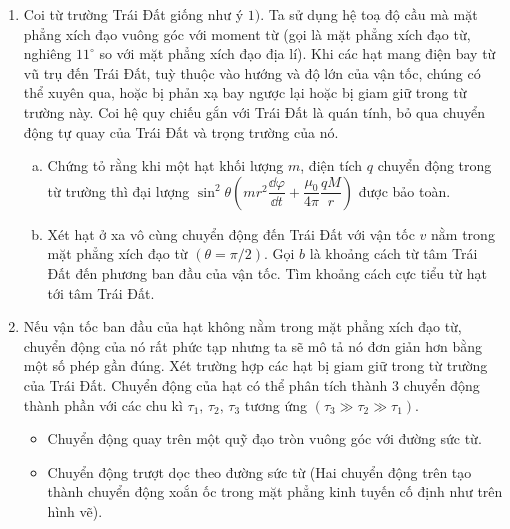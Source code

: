 \begin{vd}
\begin{enumerate}[1)]
\begin{enumerate}[a)]
\begin{center}
            \end{center}
        \end{enumerate}
        \item Coi từ trường Trái Đất giống như ý $1)$. Ta sử dụng hệ toạ độ cầu mà mặt phẳng xích đạo vuông góc với moment từ (gọi là mặt phẳng xích đạo từ, nghiêng $11^{\circ}$ so với mặt phẳng xích đạo địa lí).
        Khi các hạt mang điện bay từ vũ trụ đến Trái Đất, tuỳ thuộc vào hướng và độ lớn của vận tốc, chúng có thể xuyên qua, hoặc bị phản xạ bay ngược lại hoặc bị giam giữ trong từ trường này. Coi hệ quy chiếu gắn với Trái Đất là quán tính, bỏ qua chuyển động tự quay của Trái Đất và trọng trường của nó.
    \begin{enumerate}[a)]
        \item Chứng tỏ rằng khi một hạt khối lượng $m$, điện tích $q$ chuyển động trong từ trường thì đại lượng ${{\sin }^{2}}\theta \left( m{{r}^{2}}\dfrac{\dd \varphi }{\dd t}+\dfrac{{{\mu }_{0}}}{4\pi }\dfrac{qM}{r} \right)$ được bảo toàn.
        \item Xét hạt ở xa vô cùng chuyển động đến Trái Đất với vận tốc $v$ nằm trong mặt phẳng xích đạo từ $\left( \theta =\pi /2 \right)$. Gọi $b$ là khoảng cách từ tâm Trái Đất đến phương ban đầu của vận tốc. Tìm khoảng cách cực tiểu từ hạt tới tâm Trái Đất.
    \end{enumerate}
    \item Nếu vận tốc ban đầu của hạt không nằm trong mặt phẳng xích đạo từ, chuyển động của nó rất phức tạp nhưng ta sẽ mô tả nó đơn giản hơn bằng một số phép gần đúng. Xét trường hợp các hạt bị giam giữ trong từ trường của Trái Đất. Chuyển động của hạt có thể phân tích thành $3$ chuyển động thành phần với các chu kì ${{\tau }_{1}},\,{{\tau }_{2}},\,{{\tau }_{3}}$ tương ứng $({{\tau }_{3}}\gg{{\tau }_{2}}\gg{{\tau }_{1}})$.
    \begin{itemize}
        \item Chuyển động quay trên một quỹ đạo tròn vuông góc với đường sức từ.
        \item Chuyển động trượt dọc theo đường sức từ
        (Hai chuyển động trên tạo thành chuyển động xoắn ốc trong mặt phẳng kinh tuyến cố định như trên hình vẽ).
        \begin{center}
            


\begin{tikzpicture}[x=0.75pt,y=0.75pt,yscale=-1,xscale=1]


\end{tikzpicture}
\end{center}
\end{itemize}
\end{enumerate}
\end{vd}
